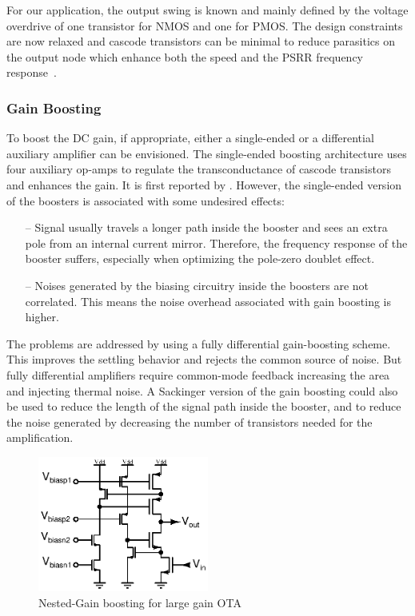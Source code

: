 For our application, the output swing is known and mainly defined by the voltage overdrive of one transistor for NMOS and one for PMOS\@. The design constraints are now relaxed and cascode transistors can be minimal to reduce parasitics on the output node which enhance both the speed and the PSRR frequency response~\cite{Ribner1984}.

\subsubsection{Gain Boosting}
To boost the DC gain, if appropriate, either a single-ended or a differential auxiliary amplifier can be envisioned. The single-ended boosting architecture uses four auxiliary op-amps to regulate the transconductance of cascode transistors and enhances the gain. It is first reported by \cite{Bult1990}. However, the single-ended version of the boosters is associated with some undesired effects:
\begin{itemize}
    \itemsep-0.5em
    \item[--] Signal usually travels a longer path inside the booster and sees an extra pole from an internal current mirror. Therefore, the frequency response of the booster suffers, especially when optimizing the pole-zero doublet effect.
    \item[--] Noises generated by the biasing circuitry inside the boosters are not correlated. This means the noise overhead associated with gain boosting is higher.
\end{itemize}
The problems are addressed by using a fully differential gain-boosting scheme. This improves the settling behavior and rejects the common source of noise. But fully differential amplifiers require common-mode feedback increasing the area and injecting thermal noise. A Sackinger version of the gain boosting could also be used to reduce the length of the signal path inside the booster, and to reduce the noise generated by decreasing the number of transistors needed for the amplification.

\begin{figure}[htp]
    \centering
    \includegraphics[width=0.5\textwidth]{Chapter7/Figs/gain-boosting.ps}
    \caption{Nested-Gain boosting for large gain OTA}
    \label{fig:nmos-nested-gain-boosting}
\end{figure}

